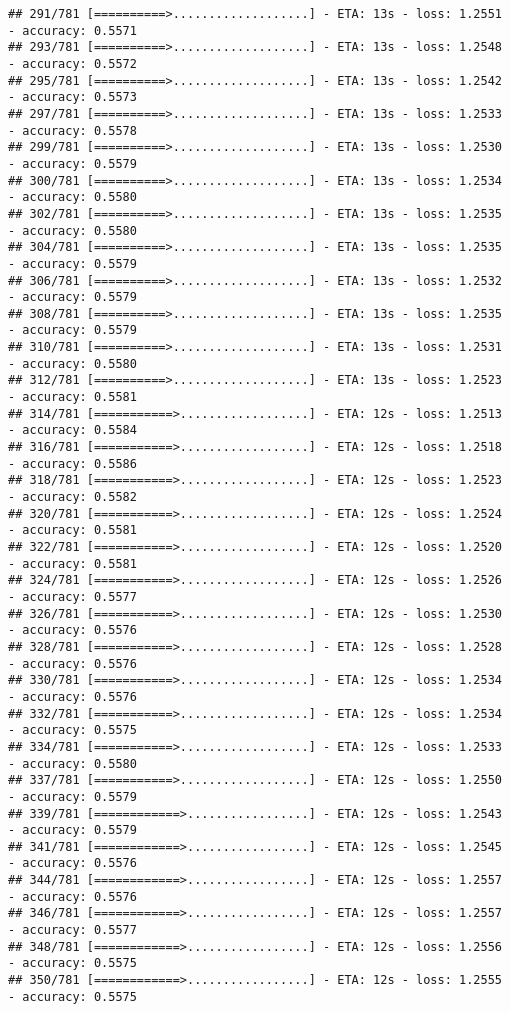 \documentclass[
]{article}
\begin{document}
\begin{verbatim}
## 291/781 [==========>...................] - ETA: 13s - loss: 1.2551 - accuracy: 0.5571
## 293/781 [==========>...................] - ETA: 13s - loss: 1.2548 - accuracy: 0.5572
## 295/781 [==========>...................] - ETA: 13s - loss: 1.2542 - accuracy: 0.5573
## 297/781 [==========>...................] - ETA: 13s - loss: 1.2533 - accuracy: 0.5578
## 299/781 [==========>...................] - ETA: 13s - loss: 1.2530 - accuracy: 0.5579
## 300/781 [==========>...................] - ETA: 13s - loss: 1.2534 - accuracy: 0.5580
## 302/781 [==========>...................] - ETA: 13s - loss: 1.2535 - accuracy: 0.5580
## 304/781 [==========>...................] - ETA: 13s - loss: 1.2535 - accuracy: 0.5579
## 306/781 [==========>...................] - ETA: 13s - loss: 1.2532 - accuracy: 0.5579
## 308/781 [==========>...................] - ETA: 13s - loss: 1.2535 - accuracy: 0.5579
## 310/781 [==========>...................] - ETA: 13s - loss: 1.2531 - accuracy: 0.5580
## 312/781 [==========>...................] - ETA: 13s - loss: 1.2523 - accuracy: 0.5581
## 314/781 [===========>..................] - ETA: 12s - loss: 1.2513 - accuracy: 0.5584
## 316/781 [===========>..................] - ETA: 12s - loss: 1.2518 - accuracy: 0.5586
## 318/781 [===========>..................] - ETA: 12s - loss: 1.2523 - accuracy: 0.5582
## 320/781 [===========>..................] - ETA: 12s - loss: 1.2524 - accuracy: 0.5581
## 322/781 [===========>..................] - ETA: 12s - loss: 1.2520 - accuracy: 0.5581
## 324/781 [===========>..................] - ETA: 12s - loss: 1.2526 - accuracy: 0.5577
## 326/781 [===========>..................] - ETA: 12s - loss: 1.2530 - accuracy: 0.5576
## 328/781 [===========>..................] - ETA: 12s - loss: 1.2528 - accuracy: 0.5576
## 330/781 [===========>..................] - ETA: 12s - loss: 1.2534 - accuracy: 0.5576
## 332/781 [===========>..................] - ETA: 12s - loss: 1.2534 - accuracy: 0.5575
## 334/781 [===========>..................] - ETA: 12s - loss: 1.2533 - accuracy: 0.5580
## 337/781 [===========>..................] - ETA: 12s - loss: 1.2550 - accuracy: 0.5579
## 339/781 [============>.................] - ETA: 12s - loss: 1.2543 - accuracy: 0.5579
## 341/781 [============>.................] - ETA: 12s - loss: 1.2545 - accuracy: 0.5576
## 344/781 [============>.................] - ETA: 12s - loss: 1.2557 - accuracy: 0.5576
## 346/781 [============>.................] - ETA: 12s - loss: 1.2557 - accuracy: 0.5577
## 348/781 [============>.................] - ETA: 12s - loss: 1.2556 - accuracy: 0.5575
## 350/781 [============>.................] - ETA: 12s - loss: 1.2555 - accuracy: 0.5575

\end{verbatim}
\end{document}
